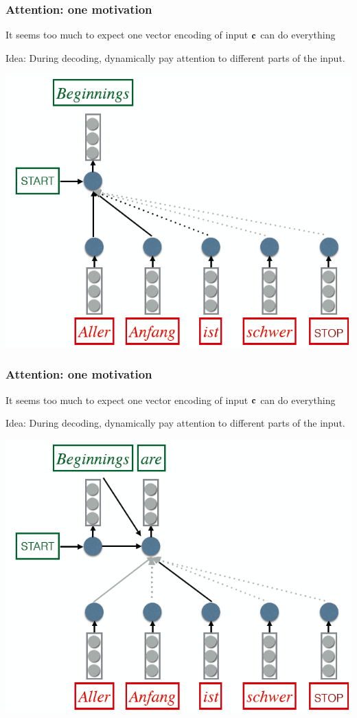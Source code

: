 \begin{frame}
\frametitle{Attention: one motivation \cite{bahdanau14translate}}
\bi
\item It seems too much to expect one vector encoding of input $\bf{c}$ can do everything\pause
\item Idea: During decoding, dynamically {\color{red} pay attention} to different parts of the input.
\ei
\pause
\centerline{\includegraphics[scale=0.33]{figs/explain_attention1}}
\end{frame}

\begin{frame}
\frametitle{Attention: one motivation \cite{bahdanau14translate}}
\bi
\item It seems too much to expect one vector encoding of input $\bf{c}$ can do everything
\item Idea: During decoding, dynamically {\color{red} pay attention} to different parts of the input.
\ei
\centerline{\includegraphics[scale=0.33]{figs/explain_attention2}}
\end{frame}

